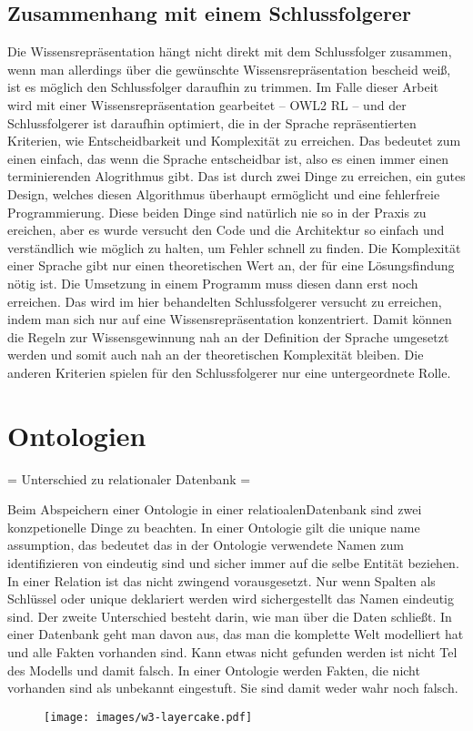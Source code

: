 \subsection{Zusammenhang mit einem Schlussfolgerer}
Die Wissensrepräsentation hängt nicht direkt mit dem Schlussfolger zusammen, wenn man allerdings über die gewünschte Wissensrepräsentation bescheid weiß, ist es möglich den Schlussfolger daraufhin zu trimmen. Im Falle dieser Arbeit wird mit einer Wissensrepräsentation gearbeitet -- OWL2 RL -- und der Schlussfolgerer ist daraufhin optimiert, die in der Sprache repräsentierten Kriterien, wie Entscheidbarkeit und Komplexität zu erreichen.
Das bedeutet zum einen einfach, das wenn die Sprache entscheidbar ist, also es einen immer einen terminierenden Alogrithmus gibt. Das ist durch zwei Dinge zu erreichen, ein gutes Design, welches diesen Algorithmus überhaupt ermöglicht und eine fehlerfreie Programmierung. Diese beiden Dinge sind natürlich nie so in der Praxis zu ereichen, aber es wurde versucht den Code und die Architektur so einfach und verständlich wie möglich zu halten, um Fehler schnell zu finden.
Die Komplexität einer Sprache gibt nur einen theoretischen Wert an, der für eine Lösungsfindung nötig ist. Die Umsetzung in einem Programm muss diesen dann erst noch erreichen. Das wird im hier behandelten Schlussfolgerer versucht zu erreichen, indem man sich nur auf eine Wissensrepräsentation konzentriert. Damit können die Regeln zur Wissensgewinnung nah an der Definition der Sprache umgesetzt werden und somit auch nah an der theoretischen Komplexität bleiben.
Die anderen Kriterien spielen für den Schlussfolgerer nur eine untergeordnete Rolle.

\section{Ontologien}
= Unterschied zu relationaler Datenbank =

Beim Abspeichern einer Ontologie in einer relatioalenDatenbank sind zwei konzpetionelle Dinge zu beachten. In einer Ontologie gilt die unique name assumption, das bedeutet das in der Ontologie verwendete Namen zum identifizieren von  eindeutig sind und sicher immer auf die selbe Entität beziehen. In einer Relation ist das nicht zwingend vorausgesetzt. Nur wenn Spalten als Schlüssel oder unique deklariert werden wird sichergestellt das Namen eindeutig sind.
Der zweite Unterschied besteht darin, wie man über die Daten schließt. In einer Datenbank geht man davon aus, das man die komplette Welt modelliert hat und alle Fakten vorhanden sind. Kann etwas nicht gefunden werden ist nicht Tel des Modells und damit falsch. In einer Ontologie werden Fakten, die nicht vorhanden sind als unbekannt eingestuft. Sie sind damit weder wahr noch falsch.
\begin{figure}
\texttt{[image: images/w3-layercake.pdf]}
\end{figure}

